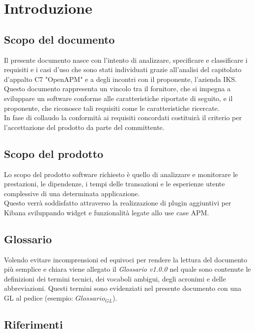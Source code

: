 \section{Introduzione}
	\subsection{Scopo del documento}
	Il presente documento nasce con l'intento di analizzare, specificare e classificare i requisiti e i casi d'uso che sono stati individuati grazie all'analisi del capitolato d'appalto C7 "OpenAPM" e a degli incontri con il proponente, l'azienda IKS.\\
	Questo documento rappresenta un vincolo tra il fornitore, che si impegna a sviluppare un software conforme alle caratteristiche riportate di seguito, e il proponente, che riconosce tali requisiti come le caratteristiche ricercate.\\
	In fase di collaudo la conformità ai requisiti concordati costituirà il criterio per l'accettazione del prodotto da parte del committente.

	\subsection{Scopo del prodotto}
	Lo scopo del prodotto software richiesto è quello di analizzare e monitorare le prestazioni, le dipendenze, i tempi delle transazioni e le esperienze utente complessive di una determinata applicazione.\\
	Questo verrà soddisfatto attraverso la realizzazione di plugin aggiuntivi per Kibana sviluppando widget e funzionalità legate allo use case APM.
	\subsection{Glossario}
		Volendo evitare incomprensioni  ed equivoci per rendere la lettura del documento più semplice e chiara viene allegato il \emph{Glossario v1.0.0} nel quale sono contenute le definizioni dei termini tecnici, dei vocaboli ambigui, degli acronimi e delle abbreviazioni. Questi termini sono evidenziati nel presente documento con una GL al pedice (esempio: $Glossario_{GL}$).
	\subsection{Riferimenti}
